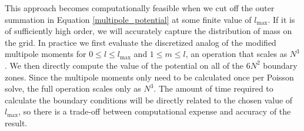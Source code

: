 \documentclass{emulateapj}
\begin{document}

This approach becomes computationally feasible when we cut off the
outer summation in Equation \ref{multipole_potential} at some finite
value of $l_{\text{max}}$. If it is of sufficiently high order, we
will accurately capture the distribution of mass on the grid. In
practice we first evaluate the discretized analog of the modified
multipole moments for $0 \leq l \leq l_{\text{max}}$ and $1 \leq m
\leq l$, an operation that scales as $N^3$. We then directly compute
the value of the potential on all of the $6N^2$ boundary zones. Since
the multipole moments only need to be calculated once per Poisson
solve, the full operation scales only as $N^3$. The amount of time
required to calculate the boundary conditions will be directly related
to the chosen value of $l_{\text{max}}$, so there is a trade-off
between computational expense and accuracy of the result.
\end{document}
